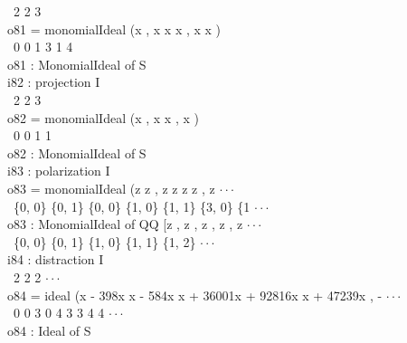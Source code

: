 \                      2     2     3\\
o81 = monomialIdeal (x , x x x , x x )\\
\                      0   0 1 3   1 4\\
\emptyLine
o81 : MonomialIdeal of S\\
\endOutput
\beginOutput
i82 : projection I\\
\emptyLine
\                      2     2   3\\
o82 = monomialIdeal (x , x x , x )\\
\                      0   0 1   1\\
\emptyLine
o82 : MonomialIdeal of S\\
\endOutput
\beginOutput
i83 : polarization I\\
\emptyLine
o83 = monomialIdeal (z      z      , z      z      z      z      , z   $\cdot\cdot\cdot$\\
\                      \{0, 0\} \{0, 1\}   \{0, 0\} \{1, 0\} \{1, 1\} \{3, 0\}   \{1 $\cdot\cdot\cdot$\\
\emptyLine
o83 : MonomialIdeal of QQ [z      , z      , z      , z      , z       $\cdot\cdot\cdot$\\
\                            \{0, 0\}   \{0, 1\}   \{1, 0\}   \{1, 1\}   \{1, 2\} $\cdot\cdot\cdot$\\
\endOutput
\beginOutput
i84 : distraction I\\
\emptyLine
\              2                             2                     2    $\cdot\cdot\cdot$\\
o84 = ideal (x  - 398x x  - 584x x  + 36001x  + 92816x x  + 47239x , - $\cdot\cdot\cdot$\\
\              0       0 3       0 4         3         3 4         4    $\cdot\cdot\cdot$\\
\emptyLine
o84 : Ideal of S\\
\endOutput

